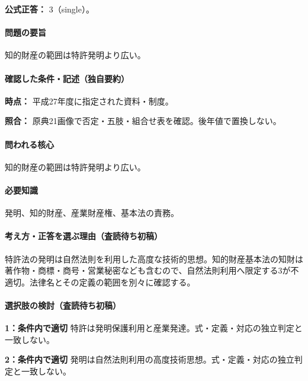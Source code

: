 \textbf{公式正答：} 3（single）。

\paragraph{問題の要旨} 知的財産の範囲は特許発明より広い。

\paragraph{確認した条件・記述（独自要約）}\mbox{}\par

\noindent\textbf{時点：} 平成27年度に指定された資料・制度。\par

\noindent\textbf{照合：} 原典21画像で否定・五肢・組合せ表を確認。後年値で置換しない。\par

\paragraph{問われる核心} 知的財産の範囲は特許発明より広い。

\paragraph{必要知識} 発明、知的財産、産業財産権、基本法の責務。

\paragraph{考え方・正答を選ぶ理由（査読待ち初稿）} 特許法の発明は自然法則を利用した高度な技術的思想。知的財産基本法の知財は著作物・商標・商号・営業秘密なども含むので、自然法則利用へ限定する3が不適切。法律名とその定義の範囲を別々に確認する。

\paragraph{選択肢の検討（査読待ち初稿）}\mbox{}\par

\noindent\textbf{1：条件内で適切} 特許は発明保護利用と産業発達。式・定義・対応の独立判定と一致しない。\par

\noindent\textbf{2：条件内で適切} 発明は自然法則利用の高度技術思想。式・定義・対応の独立判定と一致しない。\par

